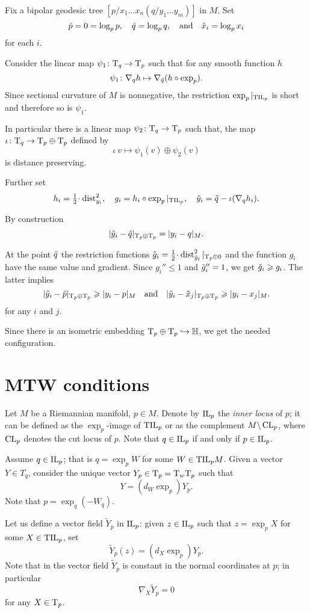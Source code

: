 \medskip

Fix a bipolar geodesic tree $[p/x_1\dots x_n(q/y_1\dots y_m)]$ in $M$.
Set 
\[\~p=0=\log_pp,\quad \~q=\log_pq,\quad\text{and}\quad \~x_i=\log_px_i\]
for each $i$. 

Consider the linear map $\psi_1\:\T_q\to \T_p$ such that for any smooth function $h$
\[\psi_1\:\nabla_{q}h\mapsto \nabla_{\~q}(h\circ\exp_p).\]
Since sectional curvature of $M$ is nonnegative, the restriction $\exp_p|_{\TIL_p}$ is short and therefore so is $\psi_1$.

In particular there is a linear map $\psi_2\:\T_q\to\T_p$ such that, the map $\iota\:\T_q\zz\to \T_p\oplus\T_p$ defined by
\[\iota\:v\mapsto \psi_1(v)\oplus \psi_2(v)\]
is distance preserving.

Further set 
\[h_i=\tfrac12\cdot\dist_{y_i}^2,
\quad
g_i=h_i\circ\exp_p|_{\TIL_p},
\quad
\~y_i=\~q-\iota(\nabla_q h_i).
\]


By construction
\[|\~y_i-\~q|_{\T_p\oplus\T_p}=|y_i-q|_M.\]

At the point $\~q$ the restriction functions $\~g_i=\tfrac12\cdot\dist^2_{\~y_i}|_{\T_p\oplus 0}$ and the function $g_i$ have the same value and gradient.
Since $g_i''\le 1$ and $\~g_i''=1$, we get $\~g_i\ge g_i$. 
The latter implies
\[
|\~y_i-\~p|_{\T_p\oplus\T_p}\ge|y_i-p|_M
\quad
\text{and}
\quad
|\~y_i-\~x_j|_{\T_p\oplus\T_p}\ge|y_i-x_j|_M.\]
for any $i$ and $j$.

Since there is an isometric embedding $\T_p\oplus\T_p\hookrightarrow \HH$,
we get the needed configuration.
\qeds


\section{MTW conditions}\label{MTW+}

Let $M$ be a Riemannian manifold, $p\in M$.
Denote by $\IL_p$ the \emph{inner locus} of $p$; it can be defined as the $\exp_p$-image of $\TIL_p$ or as the complement $M\backslash \CL_p$, where $\CL_p$ denotes the cut locus of $p$.
Note that $q\in\IL_p$ if and only if $p\in \IL_p$.

Assume $q\in\IL_p$; that is $q=\exp_pW$ for some $W\zz\in \TIL_p M$.
Given a vector $Y\in T_q$, consider the unique vector $Y_p\in\T_p=\T_w\T_p$ such that 
\[Y=(d_W\exp_p)Y_p.\]
Note that $p=\exp_q(-W_q)$.

Let us define a vector field $\tilde Y_p$ in $\IL_p$:
given $z\in\IL_p$ such that $z=\exp_pX$ for some  $X\in \TIL_p$,  set
\[\tilde Y_p(z)=(d_X\exp_p) Y_p.\]
Note that in the vector field $\tilde Y_p$ is constant in the normal coordinates at $p$;
in particular 
\[\nabla_X\tilde Y_p=0\] 
for any $X\in\T_p$.

